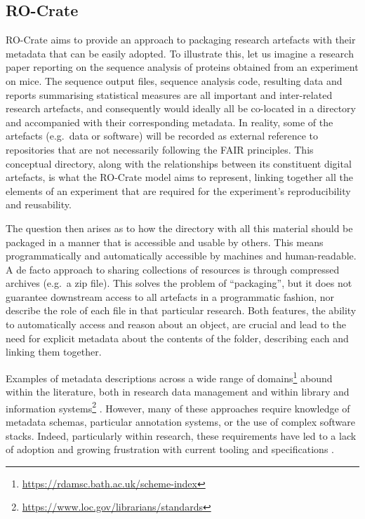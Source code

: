 \subsection{RO-Crate}\label{ch5:rocrate}

RO-Crate aims to provide an approach to packaging research artefacts
with their metadata that can be easily adopted. To illustrate this, let
us imagine a research paper reporting on the sequence analysis of
proteins obtained from an experiment on mice. The sequence output files,
sequence analysis code, resulting data and reports summarising
statistical measures are all important and inter-related research
artefacts, and consequently would ideally all be co-located in a
directory and accompanied with their corresponding metadata. In reality,
some of the artefacts (e.g.~data or software) will be recorded as
external reference to repositories that are not necessarily following
the FAIR principles. This conceptual directory, along with the
relationships between its constituent digital artefacts, is what the
RO-Crate model aims to represent, linking together all the elements of
an experiment that are required for the experiment's reproducibility and
reusability.

The question then arises as to how the directory with all this material
should be packaged in a manner that is accessible and usable by others.
This means programmatically and automatically accessible by machines and
human-readable. A de facto approach to sharing collections of resources
is through compressed archives (e.g.~a zip file). This solves the
problem of ``packaging'', but it does not guarantee downstream access to
all artefacts in a programmatic fashion, nor describe the role of each
file in that particular research. Both features, the ability to
automatically access and reason about an object, are crucial and lead to
the need for explicit metadata about the contents of the folder,
describing each and linking them together.

Examples of metadata descriptions across a wide range of
domains\footnote{\url{https://rdamsc.bath.ac.uk/scheme-index}} abound within the
literature, both in research data management
\cite{Amorim 2016,Farnel 2014,eosc-interop-framework}
and within library and information
systems\footnote{\url{https://www.loc.gov/librarians/standards}} \cite{Mai Chan 1995,ch5-127}. However, many of these approaches require
knowledge of metadata schemas, particular annotation systems, or the
use of complex software stacks. Indeed, particularly within research,
these requirements have led to a lack of adoption and growing
frustration with current tooling and specifications
\cite{ch5-94,ch5-119,ch5-102}.

